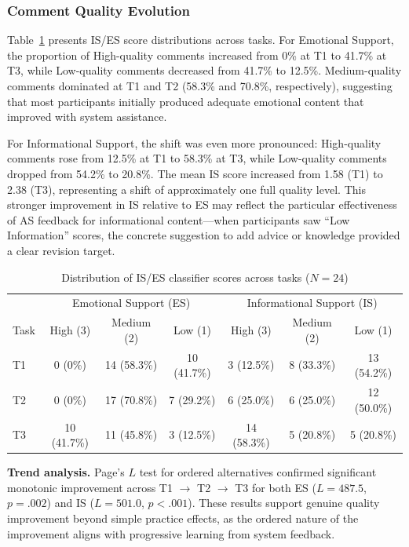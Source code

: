 \documentclass[]{llncs}
\begin{document}
\subsubsection{Comment Quality Evolution}

Table~\ref{tab:quality} presents IS/ES score distributions across tasks. For Emotional Support, the proportion of High-quality comments increased from 0\% at T1 to 41.7\% at T3, while Low-quality comments decreased from 41.7\% to 12.5\%. Medium-quality comments dominated at T1 and T2 (58.3\% and 70.8\%, respectively), suggesting that most participants initially produced adequate emotional content that improved with system assistance.

For Informational Support, the shift was even more pronounced: High-quality comments rose from 12.5\% at T1 to 58.3\% at T3, while Low-quality comments dropped from 54.2\% to 20.8\%. The mean IS score increased from 1.58 (T1) to 2.38 (T3), representing a shift of approximately one full quality level. This stronger improvement in IS relative to ES may reflect the particular effectiveness of AS feedback for informational content---when participants saw ``Low Information'' scores, the concrete suggestion to add advice or knowledge provided a clear revision target.

\begin{table}[htbp]
\centering
\caption{Distribution of IS/ES classifier scores across tasks ($N=24$)}
\label{tab:quality}
\begin{tabular}{lcccccc}
\hline
 & \multicolumn{3}{c}{Emotional Support (ES)} & \multicolumn{3}{c}{Informational Support (IS)} \\
Task & High (3) & Medium (2) & Low (1) & High (3) & Medium (2) & Low (1) \\
\hline
T1 & 0 (0\%) & 14 (58.3\%) & 10 (41.7\%) & 3 (12.5\%) & 8 (33.3\%) & 13 (54.2\%) \\
T2 & 0 (0\%) & 17 (70.8\%) & 7 (29.2\%) & 6 (25.0\%) & 6 (25.0\%) & 12 (50.0\%) \\
T3 & 10 (41.7\%) & 11 (45.8\%) & 3 (12.5\%) & 14 (58.3\%) & 5 (20.8\%) & 5 (20.8\%) \\
\hline
\end{tabular}
\end{table}

\textbf{Trend analysis.} Page’s $L$ test for ordered alternatives confirmed significant monotonic 
improvement across T1 $\rightarrow$ T2 $\rightarrow$ T3 for both ES 
($L = 487.5$, $p = .002$) and IS ($L = 501.0$, $p < .001$). These results 
support genuine quality improvement beyond simple practice effects, as the 
ordered nature of the improvement aligns with progressive learning from 
system feedback.
\end{document}
